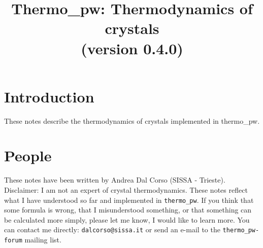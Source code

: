 \documentclass[12pt,a4paper]{article}
\def\version{0.4.0}
\def\tpw{{\sc thermo\_pw}}
\begin{document}
 
\author{}
\date{}


\title{
  \vskip 1cm
  {\color{red} \Huge Thermo\_pw: Thermodynamics of crystals} \\
  \Large (version \version)
}

\maketitle

\tableofcontents

\newpage

\section{{\color{coral}Introduction}}
These notes describe the thermodynamics of crystals implemented in \tpw. 

\section{\color{coral}People}
These notes have been written by Andrea Dal Corso (SISSA - Trieste). \\
Disclaimer: I am not an expert of crystal thermodynamics. 
These notes reflect what I have understood so far and implemented in 
\texttt{thermo\_pw}. If you think that some formula is wrong, 
that I misunderstood something, or that something can be calculated more 
simply, please let me know, I would like to learn more. 
You can contact me directly: \texttt{dalcorso@sissa.it} or send an
e-mail to the \texttt{thermo\_pw-forum} mailing list.
\end{document}
